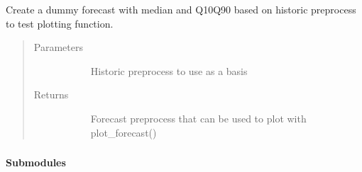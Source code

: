\documentclass[letterpaper,10pt,english]{sphinxmanual}
\begin{document}

\begin{fulllineitems}
\label{\detokenize{autoapi/src/plot/format/index:src.plot.format.dummy_forecast}}
Create a dummy forecast with median and Q10\sphinxhyphen{}Q90 based on historic preprocess to test plotting function.
\begin{quote}\begin{description}
\item[{Parameters}] \leavevmode\begin{description}
\item[{}] \leavevmode{[}\sphinxcode{\sphinxupquote{pd.DataFrame}}{]}
Historic preprocess to use as a basis

\end{description}

\item[{Returns}] \leavevmode\begin{description}
\item[{}] \leavevmode
Forecast preprocess that can be used to plot with plot\_forecast()

\end{description}

\end{description}\end{quote}

\end{fulllineitems}



\subsubsection{}
\label{\detokenize{autoapi/src/preprocess/index:module-src.preprocess}}\label{\detokenize{autoapi/src/preprocess/index:src-preprocess}}\label{\detokenize{autoapi/src/preprocess/index::doc}}

\paragraph{Submodules}
\label{\detokenize{autoapi/src/preprocess/index:submodules}}
\end{document}
